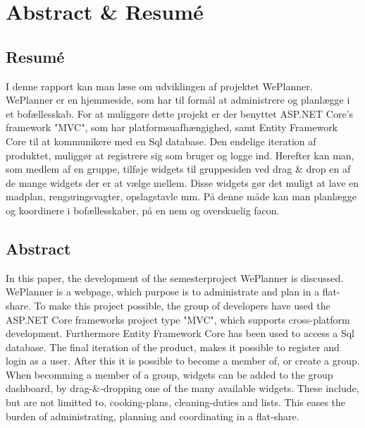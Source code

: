 \chapter{Abstract \& Resumé}
\section{Resumé}
I denne rapport kan man læse om udviklingen af projektet WePlanner. WePlanner er en hjemmeside, som har til formål at administrere og planlægge i et bofællesskab. 
For at muliggøre dette projekt er der benyttet ASP.NET Core's framework "MVC", som har platformsuafhængighed, samt Entity Framework Core til at kommunikere med en Sql database.
Den endelige iteration af produktet, muliggør at registrere sig som bruger og logge ind. Herefter kan man, som medlem af en gruppe, tilføje widgets til gruppesiden ved drag \& drop en af de mange widgets der er at vælge mellem. Disse widgets gør det muligt at lave en madplan, rengøringsvagter, opslagstavle mm. På denne måde kan man planlægge og koordinere i bofællesskaber, på en nem og overskuelig facon.

\section{Abstract}
In this paper, the development of the semesterproject WePlanner is discussed. WePlanner is a webpage, which purpose is to administrate and plan in a flat-share. 
To make this project possible, the group of developers have used the ASP.NET Core frameworks project type "MVC", which supports cross-platform development. Furthermore Entity Framework Core has been used to access a Sql database.
The final iteration of the product, makes it possible to register and login as a user. After this it is possible to become a member of, or create a group. When becomming a member of a group, widgets can be added to the group dashboard, by drag-\&-dropping one of the many available widgets. These include, but are not limitted to, cooking-plans, cleaning-duties and lists. This eases the burden of administrating, planning and coordinating in a flat-share.


